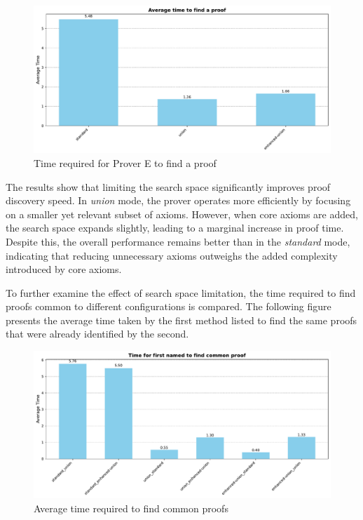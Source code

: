 \documentclass[english,version-2020-11]{uzl-thesis}
\begin{document}
\begin{figure}[h!]
    \centering
    \includegraphics[width=\textwidth]{time_to_find_proof.pdf}
    \caption{Time required for Prover E to find a proof}
    \label{fig:time_different_mode_1}
\end{figure}        
\FloatBarrier

The results show that limiting the search space significantly improves proof discovery speed. In \textit{union} mode, the prover operates more efficiently by focusing on a smaller yet relevant subset of axioms. However, when core axioms are added, the search space expands slightly, leading to a marginal increase in proof time. Despite this, the overall performance remains better than in the \textit{standard} mode, indicating that reducing unnecessary axioms outweighs the added complexity introduced by core axioms.

To further examine the effect of search space limitation, the time required to find proofs common to different configurations is compared. The following figure presents the average time taken by the first method listed to find the same proofs that were already identified by the second.

\begin{figure}[h!]
    \centering
    \includegraphics[width=\textwidth]{time_to_find_common_proof.pdf}
    \caption{Average time required to find common proofs}
    \label{fig:time_different_mode}
\end{figure}        
\FloatBarrier
\end{document}

